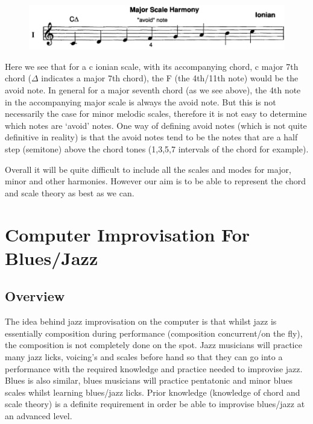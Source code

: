\documentclass[pdftex,12pt,a4paper]{report}
\begin{document}
\begin{figure}[here]
  \centering
  \includegraphics[scale=0.4]{figure/cionian.png}
  \label{fig:cionian}
\end{figure}

Here we see that for a c ionian scale, with its accompanying chord, c major 7th chord ($\Delta$ indicates a major 7th chord), the F (the 4th/11th note) would be the avoid note.  In general for a major seventh chord (as we see above), the 4th note in the accompanying major scale is always the avoid note. But this is not necessarily the case for minor melodic scales, therefore it is not easy to determine which notes are `avoid' notes. One way of defining avoid notes (which is not quite definitive in reality) is that the avoid notes tend to be the notes that are a half step (semitone) above the chord tones (1,3,5,7 intervals of the chord for example).

Overall it will be quite difficult to include all the scales and modes for major, minor and other harmonies. However our aim is to be able to represent the chord and scale theory as best as we can.

\section{Computer Improvisation For Blues/Jazz}

\subsection{Overview}
The idea behind jazz improvisation on the computer is that whilst jazz is essentially composition during performance (composition concurrent/on the fly), the composition is not completely done on the spot. Jazz musicians will practice many jazz licks, voicing's and scales before hand so that they can go into a performance with the required knowledge and practice needed to improvise jazz. Blues is also similar, blues musicians will practice pentatonic and minor blues scales whilst learning blues/jazz licks. Prior knowledge (knowledge of chord and scale theory) is a definite requirement in order be able to improvise blues/jazz at an advanced level.
\end{document}
